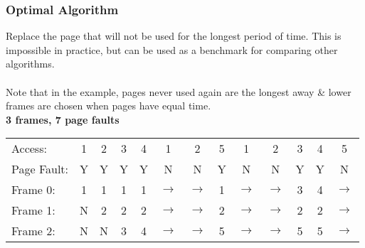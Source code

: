 \documentclass{report}
\begin{document}
\subsubsection*{Optimal Algorithm}
Replace the page that will not be used for the longest period of time. This is impossible in practice, but can be used as a benchmark for comparing other algorithms.
\\
\\ Note that in the example, pages never used again are the longest away \& lower frames are chosen when pages have equal time.
\\ \textbf{3 frames, 7 page faults}
\begin{center}
	\begin{tabular}{l c c c c c c c c c c c c}
		Access:     & 1 & 2 & 3 & 4 & 1     & 2     & 5 & 1     & 2     & 3 & 4 & 5     \\
		Page Fault: & Y & Y & Y & Y & N     & N     & Y & N     & N     & Y & Y & N     \\
		Frame 0:    & 1 & 1 & 1 & 1 & $\to$ & $\to$ & 1 & $\to$ & $\to$ & 3 & 4 & $\to$ \\
		Frame 1:    & N & 2 & 2 & 2 & $\to$ & $\to$ & 2 & $\to$ & $\to$ & 2 & 2 & $\to$ \\
		Frame 2:    & N & N & 3 & 4 & $\to$ & $\to$ & 5 & $\to$ & $\to$ & 5 & 5 & $\to$ \\
	\end{tabular}
\end{center}
\end{document}
